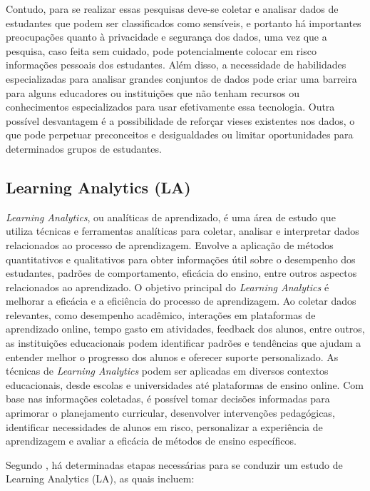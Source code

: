 Contudo, para se realizar essas pesquisas deve-se coletar e analisar dados de estudantes que podem ser classificados como sensíveis, e portanto há importantes preocupações quanto à privacidade e segurança dos dados, uma vez que a pesquisa, caso feita sem cuidado, pode potencialmente colocar em risco informações pessoais dos estudantes. Além disso, a necessidade de habilidades especializadas para analisar grandes conjuntos de dados pode criar uma barreira para alguns educadores ou instituições que não tenham recursos ou conhecimentos especializados para usar efetivamente essa tecnologia. Outra possível desvantagem é a possibilidade de reforçar vieses existentes nos dados, o que pode perpetuar preconceitos e desigualdades ou limitar oportunidades para determinados grupos de estudantes.



\subsection{Learning Analytics (LA)}

\textit{Learning Analytics}, ou {analíticas de aprendizado}, é uma área de estudo que utiliza técnicas e ferramentas analíticas para coletar, analisar e interpretar dados relacionados ao processo de aprendizagem. Envolve a aplicação de métodos quantitativos e qualitativos para obter informações útil sobre o desempenho dos estudantes, padrões de comportamento, eficácia do ensino, entre outros aspectos relacionados ao aprendizado. O objetivo principal do \textit{Learning Analytics} é melhorar a eficácia e a eficiência do processo de aprendizagem. Ao coletar dados relevantes, como desempenho acadêmico, interações em plataformas de aprendizado online, tempo gasto em atividades, feedback dos alunos, entre outros, as instituições educacionais podem identificar padrões e tendências que ajudam a entender melhor o progresso dos alunos e oferecer suporte personalizado. As técnicas de \textit{Learning Analytics} podem ser aplicadas em diversos contextos educacionais, desde escolas e universidades até plataformas de ensino online. Com base nas informações coletadas, é possível tomar decisões informadas para aprimorar o planejamento curricular, desenvolver intervenções pedagógicas, identificar necessidades de alunos em risco, personalizar a experiência de aprendizagem e avaliar a eficácia de métodos de ensino específicos.

{Segundo , há determinadas etapas necessárias para se conduzir um estudo de Learning Analytics (LA), as quais incluem:}

